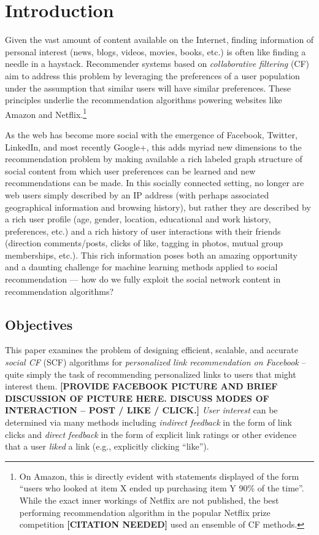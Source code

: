 \documentclass{sig-alternate}
\begin{document}
\section{Introduction}

Given the vast amount of content available on the Internet, finding
information of personal interest (news, blogs, videos, movies, books,
etc.) is often like finding a needle in a haystack.  Recommender
systems based on \emph{collaborative filtering} (CF) aim to address
this problem by leveraging the preferences of a user
population under the assumption that similar users
will have similar preferences.  These principles underlie the
recommendation algorithms powering websites like Amazon and
Netflix.\footnote{On Amazon, this is directly evident with statements
displayed of the form ``users who looked at item X ended up purchasing
item Y 90\% of the time''.  While the exact inner workings of Netflix
are not published, the best performing recommendation algorithm in
the popular Netflix prize competition {\bf [CITATION NEEDED]} 
used an ensemble of CF methods.}

As the web has become more social with the emergence of Facebook,
Twitter, LinkedIn, and most recently Google+, this adds myriad new
dimensions to the recommendation problem by making available a rich
labeled graph structure of social content from which user preferences
can be learned and new recommendations can be made.  In this socially
connected setting, no longer are web users simply described by an IP
address (with perhaps associated geographical information and browsing
history), but rather they are described by a rich user profile (age,
gender, location, educational and work history, preferences, etc.)
and a rich history of user interactions with their friends (direction
comments/posts, clicks of like, tagging in photos, mutual group
memberships, etc.).  This rich information poses both an amazing
opportunity and a daunting challenge for machine learning methods
applied to social recommendation --- how do we fully exploit the social
network content in recommendation algorithms?

\subsection{Objectives}

This paper examines the problem of designing efficient, scalable, and
accurate \emph{social CF} (SCF) algorithms for \emph{personalized link
recommendation on Facebook} -- quite simply the task of recommending
personalized links to users that might interest them.  {\bf [PROVIDE
FACEBOOK PICTURE AND BRIEF DISCUSSION OF PICTURE HERE.  DISCUSS
MODES OF INTERACTION -- POST / LIKE / CLICK.]}  \emph{User
interest} can be determined via many methods including \emph{indirect
feedback} in the form of link clicks and \emph{direct feedback} in the form of
explicit link ratings or other evidence that a user \emph{liked}
a link (e.g., explicitly clicking ``like'').
\end{document}
